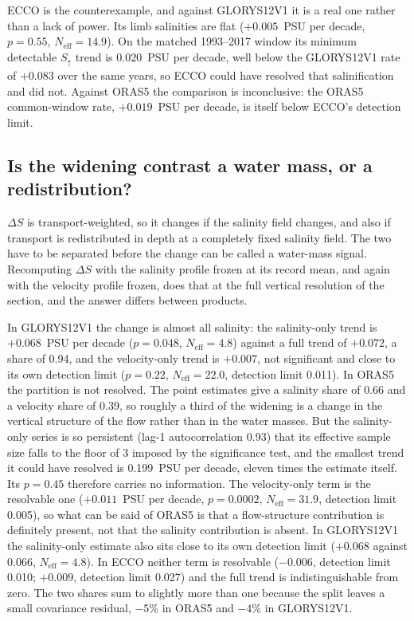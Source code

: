 ECCO is the counterexample, and against GLORYS12V1 it is a real one rather than
a lack of power. Its limb salinities are flat ($+0.005$~PSU per decade,
$p=0.55$, $N_{\text{eff}}=14.9$). On the matched 1993--2017 window its minimum
detectable $S_{\uparrow}$ trend is 0.020~PSU per decade, well below the
GLORYS12V1 rate of $+0.083$ over the same years, so ECCO could have resolved
that salinification and did not. Against ORAS5 the comparison is inconclusive:
the ORAS5 common-window rate, $+0.019$~PSU per decade, is itself below ECCO's
detection limit.

\subsection*{Is the widening contrast a water mass, or a redistribution?}

$\Delta S$ is transport-weighted, so it changes if the salinity field changes,
and also if transport is redistributed in depth at a completely fixed salinity
field. The two have to be separated before the change can be called a water-mass
signal. Recomputing $\Delta S$ with the salinity profile frozen at its record
mean, and again with the velocity profile frozen, does that at the full vertical
resolution of the section, and the answer differs between products.

In GLORYS12V1 the change is almost all salinity: the salinity-only trend is
$+0.068$~PSU per decade ($p=0.048$, $N_{\text{eff}}=4.8$) against a full trend
of $+0.072$, a share of 0.94, and the velocity-only trend is $+0.007$, not
significant and close to its own detection limit ($p=0.22$,
$N_{\text{eff}}=22.0$, detection limit 0.011).
In ORAS5 the partition is not resolved. The point estimates give a salinity
share of 0.66 and a velocity share of 0.39, so roughly a third of the widening
is a change in the vertical structure of the flow rather than in the water
masses. But the salinity-only series is so persistent (lag-1 autocorrelation
0.93) that its effective sample size falls to the floor of 3 imposed by the
significance test, and the smallest trend it could have resolved is
0.199~PSU per decade, eleven times the estimate itself. Its $p=0.45$ therefore
carries no information. The velocity-only term is the resolvable one
($+0.011$~PSU per decade, $p=0.0002$, $N_{\text{eff}}=31.9$, detection limit
0.005), so what can be said of ORAS5 is that a flow-structure contribution is
definitely present, not that the salinity contribution is absent. In GLORYS12V1
the salinity-only estimate also sits close to its own detection limit
($+0.068$ against 0.066, $N_{\text{eff}}=4.8$). In ECCO neither term is
resolvable ($-0.006$, detection limit 0.010; $+0.009$, detection limit 0.027)
and the full trend is indistinguishable from zero. The two shares sum
to slightly more than one because the split leaves a small covariance residual,
$-5$\% in ORAS5 and $-4$\% in GLORYS12V1.

